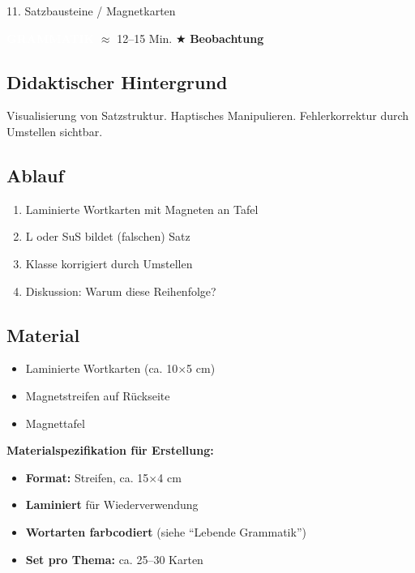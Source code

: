 \documentclass[11pt, a4paper]{article}
\newcommand{\tagGrammatik}{\colorbox{grammatik}{\textcolor{white}{\footnotesize\textbf{GRAMMATIK}}}}
\newcommand{\zeit}[1]{\textcolor{grau}{\footnotesize $\approx$ #1 Min.}}
\newcommand{\beobachtung}{\textcolor{erfolg}{\footnotesize $\bigstar$ \textbf{Beobachtung}}}
\begin{document}
\vspace{1em}

\begin{methode}{11. Satzbausteine / Magnetkarten}

\tagGrammatik{} \zeit{12--15} \hfill \beobachtung

\subsection*{Didaktischer Hintergrund}
Visualisierung von Satzstruktur. Haptisches Manipulieren. Fehlerkorrektur durch Umstellen sichtbar.

\subsection*{Ablauf}
\begin{enumerate}[leftmargin=*]
    \item Laminierte Wortkarten mit Magneten an Tafel
    \item L oder SuS bildet (falschen) Satz
    \item Klasse korrigiert durch Umstellen
    \item Diskussion: Warum diese Reihenfolge?
\end{enumerate}

\subsection*{Material}
\begin{materialbox}
\begin{itemize}[label=$\square$, leftmargin=*]
    \item Laminierte Wortkarten (ca. 10$\times$5 cm)
    \item Magnetstreifen auf Rückseite
    \item Magnettafel
\end{itemize}

\textbf{Materialspezifikation für Erstellung:}
\begin{itemize}[leftmargin=*]
    \item \textbf{Format:} Streifen, ca. 15$\times$4 cm
    \item \textbf{Laminiert} für Wiederverwendung
    \item \textbf{Wortarten farbcodiert} (siehe ``Lebende Grammatik'')
    \item \textbf{Set pro Thema:} ca. 25--30 Karten
\end{itemize}
\end{materialbox}

\end{methode}
\end{document}
